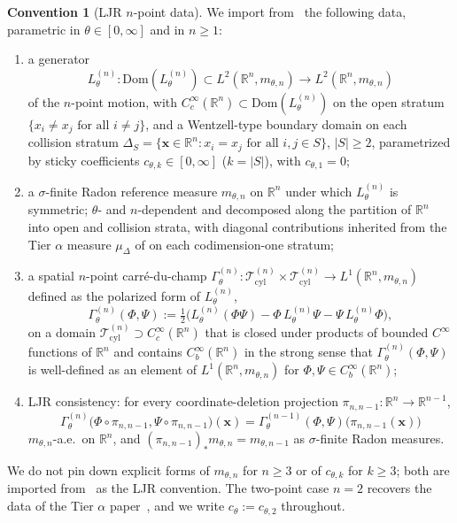 \documentclass[11pt,reqno]{amsart}
\theoremstyle{plain}
\theoremstyle{definition}
\newtheorem{convention}[theorem]{Convention}
\theoremstyle{remark}
\newcommand{\R}{\mathbb R}
\newcommand{\Dom}{\mathrm{Dom}}
\newcommand{\cT}{\mathcal T}
\newcommand{\Tcyl}{\cT_{\mathrm{cyl}}}
\newcommand{\GamM}[1]{\Gamma^{(#1)}_{\theta}}
\newcommand{\Lth}[1]{L^{(#1)}_{\theta}}
\begin{document}
\begin{convention}[LJR \texorpdfstring{$n$}{n}-point data]\label{conv:LJR-n}
We import from~\cite[\S 3--4]{LeJanRaimond2004} the following data,
parametric in $\theta\in[0,\infty]$ and in $n\ge 1$:
\begin{enumerate}
\item[$(\mathrm i)$] a generator
\[
  \Lth{n}\colon\Dom(\Lth{n})\subset L^{2}(\R^{n},m_{\theta,n})\longrightarrow L^{2}(\R^{n},m_{\theta,n})
\]
of the $n$-point motion, with $C_{c}^{\infty}(\R^{n})\subset\Dom(\Lth{n})$
on the open stratum $\{x_{i}\neq x_{j}\text{ for all }i\neq j\}$,
and a Wentzell-type boundary domain on each collision stratum
$\Delta_{S}=\{\mathbf x\in\R^{n}:x_{i}=x_{j}\text{ for all }i,j\in S\}$,
$|S|\ge 2$, parametrized by sticky coefficients
$c_{\theta,k}\in[0,\infty]$ ($k=|S|$), with $c_{\theta,1}=0$;
\item[$(\mathrm{ii})$] a $\sigma$-finite Radon reference measure
$m_{\theta,n}$ on $\R^{n}$ under which $\Lth{n}$ is symmetric;
$\theta$- and $n$-dependent and decomposed along the partition of
$\R^{n}$ into open and collision strata, with diagonal contributions
inherited from the Tier $\alpha$ measure $\mu_{\Delta}$ of
\cite{StickyFlowGammaSeed} on each codimension-one stratum;
\item[$(\mathrm{iii})$] a spatial $n$-point carr\'e-du-champ
$\GamM{n}\colon\Tcyl^{(n)}\times\Tcyl^{(n)}\to L^{1}(\R^{n},m_{\theta,n})$
defined as the polarized form of $\Lth{n}$,
\begin{equation}\label{eq:Gamma-n-def}
  \GamM{n}(\Phi,\Psi)
  :=\tfrac12\bigl(\Lth{n}(\Phi\Psi)-\Phi\,\Lth{n}\Psi-\Psi\,\Lth{n}\Phi\bigr),
\end{equation}
on a domain $\Tcyl^{(n)}\supset C_{c}^{\infty}(\R^{n})$ that is
closed under products of bounded $C^{\infty}$ functions of $\R^{n}$
and contains $C_{b}^{\infty}(\R^{n})$ in the strong sense that
$\GamM{n}(\Phi,\Psi)$ is well-defined as an element of
$L^{1}(\R^{n},m_{\theta,n})$ for $\Phi,\Psi\in C_{b}^{\infty}(\R^{n})$;
\item[$(\mathrm{iv})$] LJR consistency: for every coordinate-deletion
projection $\pi_{n,n-1}\colon\R^{n}\to\R^{n-1}$,
\begin{equation}\label{eq:LJR-consistency}
  \GamM{n}\bigl(\Phi\circ\pi_{n,n-1},\Psi\circ\pi_{n,n-1}\bigr)(\mathbf x)
  =\GamM{n-1}(\Phi,\Psi)\bigl(\pi_{n,n-1}(\mathbf x)\bigr)
\end{equation}
$m_{\theta,n}$-a.e.\ on $\R^{n}$, and
$(\pi_{n,n-1})_{*}m_{\theta,n}=m_{\theta,n-1}$ as $\sigma$-finite
Radon measures.
\end{enumerate}
We do not pin down explicit forms of $m_{\theta,n}$ for $n\ge 3$ or
of $c_{\theta,k}$ for $k\ge 3$; both are imported
from~\cite[\S 3--4]{LeJanRaimond2004} as the LJR convention. The
two-point case $n=2$ recovers the data of the Tier $\alpha$
paper~\cite{StickyFlowGammaSeed}, and we write
$c_{\theta}:=c_{\theta,2}$ throughout.
\end{convention}
\end{document}
